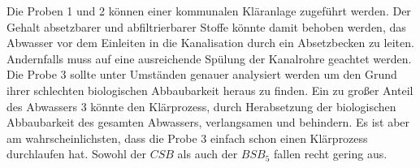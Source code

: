 
Die Proben 1 und 2 können einer kommunalen Kläranlage zugeführt werden. Der Gehalt absetzbarer und abfiltrierbarer Stoffe könnte damit behoben werden, das Abwasser vor dem Einleiten in die Kanalisation durch ein Absetzbecken zu leiten. Andernfalls muss auf eine ausreichende Spülung der Kanalrohre geachtet werden. Die Probe 3 sollte unter Umständen genauer analysiert werden um den Grund ihrer schlechten biologischen Abbaubarkeit heraus zu finden. Ein zu großer Anteil des Abwassers 3 könnte den Klärprozess, durch Herabsetzung der biologischen Abbaubarkeit des gesamten Abwassers, verlangsamen und behindern. Es ist aber am wahrscheinlichsten, dass die Probe 3 einfach schon einen Klärprozess durchlaufen hat. Sowohl der $CSB$ als auch der $BSB_5$ fallen recht gering aus. 



